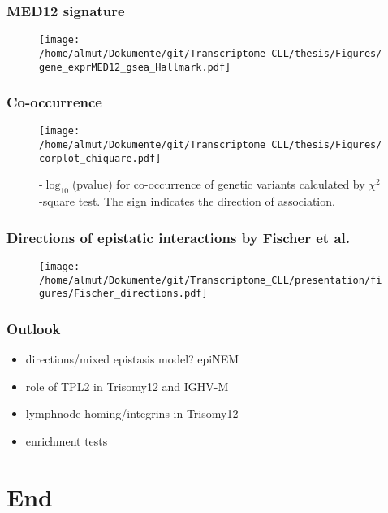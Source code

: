 \documentclass[xcolor=dvipsnames,t,10pt]{beamer}
\begin{document}
%
% 
\begin{frame}[c]
	\frametitle{MED12 signature}
	\begin{figure}
		\centering
		\texttt{[image: /home/almut/Dokumente/git/Transcriptome\_CLL/thesis/Figures/gene\_exprMED12\_gsea\_Hallmark.pdf]}
	\end{figure}
\end{frame}
%
%
\begin{frame}[c]
	\frametitle{Co-occurrence}
	\begin{figure}
		\centering
		\texttt{[image: /home/almut/Dokumente/git/Transcriptome\_CLL/thesis/Figures/corplot\_chiquare.pdf]}
		\caption{-$\log_{10}$(pvalue) for co-occurrence of genetic variants calculated by $\chi^2$-square test. The sign indicates the direction of association.}
	\end{figure}
\end{frame}
%
% 
%
\begin{frame}[c]
	\frametitle{Directions of epistatic interactions by Fischer et al.}
	\begin{figure}
		\centering
		\texttt{[image: /home/almut/Dokumente/git/Transcriptome\_CLL/presentation/figures/Fischer\_directions.pdf]}
	\end{figure}
\end{frame}
%
%
\begin{frame}[c]
	\frametitle{Outlook}
	\begin{itemize}
		\item directions/mixed epistasis model? epiNEM
		\item role of TPL2 in Trisomy12 and IGHV-M
		\item lymphnode homing/integrins in Trisomy12
		\item enrichment tests 
	\end{itemize}
\end{frame}

\section{End}
\end{document}
